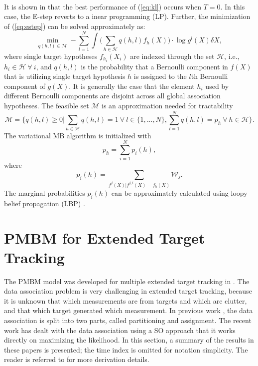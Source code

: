 ~\\
It is shown in \cite{variational} that the best performance of (\ref{eq:kl}) occurs when $T=0$. In this case, the E-step reverts to a inear programming (LP). Further, the minimization of (\ref{eq:estep}) can be solved approximately as:
\begin{equation}
    \min\limits_{q(h,l)\in\mathcal{M}}-\sum^N_{l=1}\int \Bigg(\sum_{h\in\mathcal{H}}q(h,l)f_{h}(X)\Bigg)\cdot\log g^l(X)\delta X,
    \label{eq:qhj}
\end{equation}
where single target hypotheses $f_{h_i}(X_i)$ are indexed through the set $\mathcal{H}$, i.e., $h_i\in\mathcal{H}~\forall~i$, and $q(h,l)$ is the probability that a Bernoulli component in $f(X)$ that is utilizing single target hypothesis $h$ is assigned to the $l$th Bernoulli component of $g(X)$. It is generally the case that the element $h_i$ used by different Bernoulli components are disjoint across all global association hypotheses. The feasible set $\mathcal{M}$ is an approximation needed for tractability
\begin{equation}
    \mathcal{M} = \Bigg\{q(h,l)\geq0\Bigg|\sum_{h\in\mathcal{H}}q(h,l)=1 ~\forall~ l\in\{1,...,N\},\sum^N_{l=1}q(h,l)=p_h ~\forall~ h\in\mathcal{H}\Bigg\}.
    \label{eq:polytope}
\end{equation}
The variational MB algorithm is initialized with
\begin{equation}
    p_h = \sum_{i=1}^N p_i(h),
\end{equation}
where
\begin{equation}
p_i(h) = \sum\limits_{f^j(X)|f^{j,i}(X)=f_h(X)}\mathcal{W}_j.
\label{eq:marginalprob}
\end{equation}
The marginal probabilities $p_i(h)$ can be approximately calculated using loopy belief propagation (LBP) \cite{lbp}.

\section{PMBM for Extended Target Tracking}
The PMBM model was developed for multiple extended target tracking in \cite{pmbmextended,pmbmextended2,soextended}. The data association problem is very challenging in extended target tracking, because it is unknown that which measurements are from targets and which are clutter, and that which target generated which measurement. In previous work \cite{pmbmextended,pmbmextended2}, the data association is split into two parts, called partitioning and assignment. The recent work \cite{soextended} has dealt with the data association using a SO approach that it works directly on maximizing the likelihood. In this section, a summary of the results in these papers is presented; the time index is omitted for notation simplicity. The reader is referred to \cite{pmbmextended,pmbmextended2,soextended} for more derivation details.  

